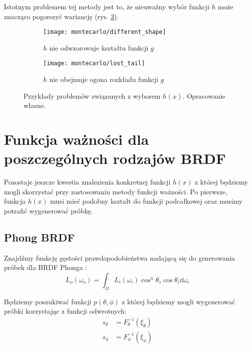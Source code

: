 \documentclass[../main.tex]{subfiles}
\begin{document}
Istotnym problemem tej metody jest to, że nieuważny wybór funkcji $h$ może
znacząco pogorszyć wariancję (rys. \ref{fig:ImportanceSamplingProblems}).

\begin{figure}
  \centering

  \begin{subfigure}[t]{0.45\textwidth}
    \texttt{[image: montecarlo/different\_shape]}
    \label{fig:ImportanceSamplingWrongFunction}
    \caption{$h$ nie odwzorowuje kształtu funkcji $g$}
  \end{subfigure}
  \begin{subfigure}[t]{0.45\textwidth}
    \centering
    \texttt{[image: montecarlo/lost\_tail]}
    \label{fig:ImportanceSamplingLostTail}
    \caption{$h$ nie obejmuje ogona rozkładu funkcji $g$}
  \end{subfigure}

  \caption{Przykłady problemów związanych z wyborem $h(x)$. Opracowanie własne.}
  \label{fig:ImportanceSamplingProblems}
\end{figure}

\section{Funkcja ważności dla poszczególnych rodzajów BRDF}

Pozostaje jeszcze kwestia znalezienia konkretnej funkcji $h(x)$ z której będziemy mogli skorzystać przy zastosowaniu metody funkcji ważności. Po pierwsze, funkcja $h(x)$ musi mieć podobny kształt do funkcji podcałkowej oraz musimy potrafić wygenerować próbkę.

\subsection{Phong BRDF}

Znajdźmy funkcję gęstości prawdopodobieństwa nadającą się do generowania próbek dla BRDF Phonga \cite{NotesImportanceSampling,ImportanceSamplingForProduction}:
\[
  L_o(\omega_o) = \int_{\Omega} {
    L_i(\omega_i) \cos^{n}\theta_s \cos\theta_i \dd \omega_i
  }
\]

Będziemy poszukiwać funkcji $p(\theta, \phi)$ z której będziemy mogli wygenerować próbki korzystając z funkcji odwrotnych:
\begin{align*}
  s_\theta &= F_{\theta}^{-1}(\xi_\theta) \\
  s_\phi &= F_{\phi}^{-1}(\xi_\phi)
\end{align*}
\end{document}
